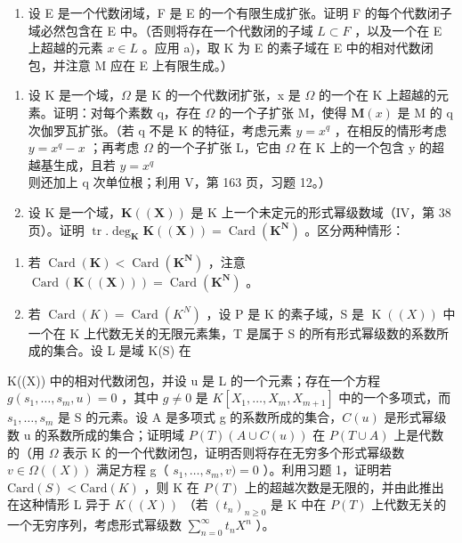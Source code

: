 \begin{enumerate}
\def\labelenumi{\alph{enumi})}
\setcounter{enumi}{1}
\tightlist
\item
  设 E 是一个代数闭域，F 是 E 的一个有限生成扩张。证明 F 的每个代数闭子域必然包含在 E 中。（否则将存在一个代数闭的子域 \(L \subset F\) ，以及一个在 E 上超越的元素 \(x \in L\) 。应用 a)，取 K 为 E 的素子域在 E 中的相对代数闭包，并注意 M 应在 E 上有限生成。）
\end{enumerate}

\begin{enumerate}
\def\labelenumi{\arabic{enumi})}
\setcounter{enumi}{16}
\item
  设 K 是一个域，\(\Omega\) 是 K 的一个代数闭扩张，x 是 \(\Omega\) 的一个在 K 上超越的元素。证明：对每个素数 q，存在 \(\Omega\) 的一个子扩张 M，使得 \(\mathbf{M}(x)\) 是 M 的 q 次伽罗瓦扩张。（若 q 不是 K 的特征，考虑元素 \(y = x^{q}\) ，在相反的情形考虑 \(y = x^{q} - x\) ；再考虑 \(\Omega\) 的一个子扩张 L，它由 \(\Omega\) 在 K 上的一个包含 y 的超越基生成，且若 \(y = x^{q}\) 则还加上 q 次单位根；利用 V，第 163 页，习题 12。）
\item
  设 K 是一个域，\(\mathbf{K}((\mathbf{X}))\) 是 K 上一个未定元的形式幂级数域（IV，第 38 页）。证明 \(\operatorname{tr}.\deg_{\mathbf{K}}\mathbf{K}((\mathbf{X}))=\operatorname{Card}(\mathbf{K}^{\mathbf{N}})\) 。区分两种情形：
\end{enumerate}

\begin{enumerate}
\def\labelenumi{\alph{enumi})}
\item
  若 \(\operatorname{Card}(\mathbf{K}) < \operatorname{Card}(\mathbf{K}^{\mathbf{N}})\) ，注意 \(\operatorname{Card}(\mathbf{K}((\mathbf{X}))) = \operatorname{Card}(\mathbf{K}^{\mathbf{N}})\) 。
\item
  若 \(\operatorname{Card}(K) = \operatorname{Card}(K^{N})\) ，设 P 是 K 的素子域，S 是 \(\operatorname{K}((X))\) 中一个在 K 上代数无关的无限元素集，T 是属于 S 的所有形式幂级数的系数所成的集合。设 L 是域 K(S) 在
\end{enumerate}

K((X)) 中的相对代数闭包，并设 u 是 L 的一个元素；存在一个方程 \(g(s_{1}, \ldots, s_{m}, u) = 0\) ，其中 \(g \neq 0\) 是 \(K[X_{1}, \ldots, X_{m}, X_{m+1}]\) 中的一个多项式，而 \(s_{1}, \ldots, s_{m}\) 是 S 的元素。设 A 是多项式 g 的系数所成的集合，\(C(u)\) 是形式幂级数 u 的系数所成的集合；证明域 \(P(T)(A \cup C(u))\) 在 \(P(T \cup A)\) 上是代数的（用 \(\Omega\) 表示 K 的一个代数闭包，证明否则将存在无穷多个形式幂级数 \(v \in \Omega((X))\) 满足方程 g（ \(s_{1}, \ldots, s_{m}, v) = 0\) ）。利用习题 1，证明若 \(\text{Card}(S) < \text{Card}(K)\) ，则 K 在 \(P(T)\) 上的超越次数是无限的，并由此推出在这种情形 L 异于 \(K((X))\) （若 \((t_{n})_{n \geqslant 0}\) 是 K 中在 \(P(T)\) 上代数无关的一个无穷序列，考虑形式幂级数 \(\sum_{n=0}^{\infty} t_{n} X^{n}\) ）。

